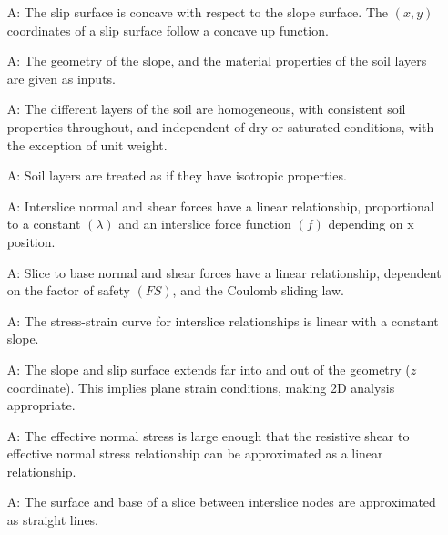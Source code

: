 \documentclass[12pt]{article}
\newcounter{assumpnum} %
\begin{document}
\begin{enumerate}[label=A\arabic*:,ref={\arabic*}]
\item [A\refstepcounter{assumpnum}\theassumpnum: \label{A_Concave}] The
  slip surface is concave with respect to the slope surface. The $(x,y)$
  coordinates of a slip surface follow a concave up function.

\item [A\refstepcounter{assumpnum}\theassumpnum: \label{A_Input}] The
  geometry of the slope, and the material properties of the soil
  layers are given as inputs.

\item [A\refstepcounter{assumpnum}\theassumpnum: \label{A_Homo}] The
  different layers of the soil are homogeneous, with consistent soil
  properties throughout, and independent of dry or saturated
  conditions, with the exception of unit weight.

\item [A\refstepcounter{assumpnum}\theassumpnum: \label{A_Isotropic}]
  Soil layers are treated as if they have isotropic properties.
  
\item [A\refstepcounter{assumpnum}\theassumpnum: \label{A_Base}]
  Interslice normal and shear forces have a linear relationship,
  proportional to a constant $\left({\lambda}\right)$ and an
  interslice force function $\left({f}\right)$ depending on x
  position.

\item [A\refstepcounter{assumpnum}\theassumpnum: \label{A_Interslice}]
  Slice to base normal and shear forces have a linear relationship,
  dependent on the factor of safety $\left({FS}\right)$, and the
  Coulomb sliding law.

\item
  [A\refstepcounter{assumpnum}\theassumpnum: \label{A_StressStrain}]
  The stress-strain curve for interslice relationships is linear with
  a constant slope.
  
\item [A\refstepcounter{assumpnum}\theassumpnum: \label{A_2D}] The
  slope and slip surface extends far into and out of the geometry ($z$
  coordinate). This implies plane strain conditions, making 2D
  analysis appropriate.

\item [A\refstepcounter{assumpnum}\theassumpnum: \label{A_Lin}] The
  effective normal stress is large enough that the resistive shear to
  effective normal stress relationship can be approximated as a linear
  relationship.

\item [A\refstepcounter{assumpnum}\theassumpnum: \label{A_Straight}]
  The surface and base of a slice between interslice nodes are
  approximated as straight lines.
\end{enumerate}
\end{document}

